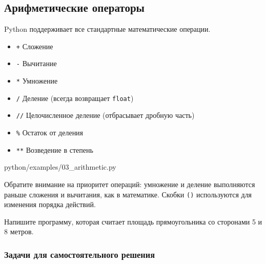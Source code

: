 \subsection{Арифметические операторы}

Python поддерживает все стандартные математические операции.

\begin{itemize}
    \item \texttt{+} Сложение
    \item \texttt{-} Вычитание
    \item \texttt{*} Умножение
    \item \texttt{/} Деление (всегда возвращает \texttt{float})
    \item \texttt{//} Целочисленное деление (отбрасывает дробную часть)
    \item \texttt{\%} Остаток от деления
    \item \texttt{**} Возведение в степень
\end{itemize}

\begin{codefile}[python]{python/examples/03_arithmetic.py}
\end{codefile}

Обратите внимание на приоритет операций: умножение и деление выполняются раньше сложения и вычитания, как в математике. Скобки \texttt{()} используются для изменения порядка действий.

\begin{taskbox}[Калькулятор]
Напишите программу, которая считает площадь прямоугольника со сторонами 5 и 8 метров.
\end{taskbox}

\subsubsection*{Задачи для самостоятельного решения}

